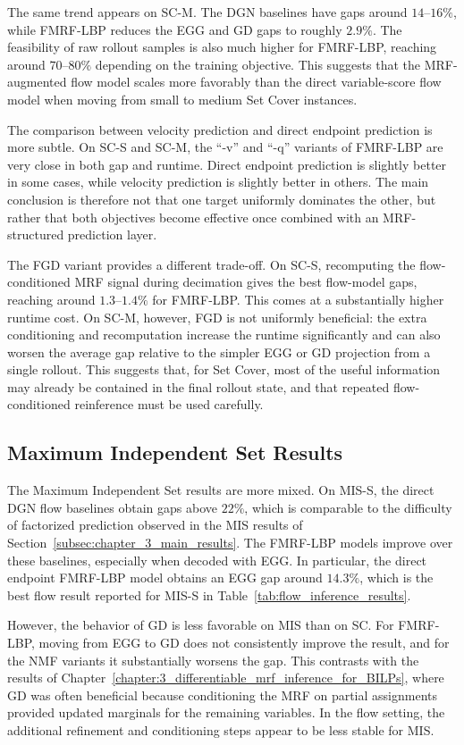 The same trend appears on SC-M. The DGN baselines have gaps around $14$--$16\%$, while FMRF-LBP reduces the EGG and GD gaps to roughly $2.9\%$. The feasibility of raw rollout samples is also much higher for FMRF-LBP, reaching around $70$--$80\%$ depending on the training objective. This suggests that the MRF-augmented flow model scales more favorably than the direct variable-score flow model when moving from small to medium Set Cover instances.

The comparison between velocity prediction and direct endpoint prediction is more subtle. On SC-S and SC-M, the ``-v'' and ``-q'' variants of FMRF-LBP are very close in both gap and runtime. Direct endpoint prediction is slightly better in some cases, while velocity prediction is slightly better in others. The main conclusion is therefore not that one target uniformly dominates the other, but rather that both objectives become effective once combined with an MRF-structured prediction layer.

The FGD variant provides a different trade-off. On SC-S, recomputing the flow-conditioned MRF signal during decimation gives the best flow-model gaps, reaching around $1.3$--$1.4\%$ for FMRF-LBP. This comes at a substantially higher runtime cost. On SC-M, however, FGD is not uniformly beneficial: the extra conditioning and recomputation increase the runtime significantly and can also worsen the average gap relative to the simpler EGG or GD projection from a single rollout. This suggests that, for Set Cover, most of the useful information may already be contained in the final rollout state, and that repeated flow-conditioned reinference must be used carefully.

\subsection{Maximum Independent Set Results}

The Maximum Independent Set results are more mixed. On MIS-S, the direct DGN flow baselines obtain gaps above $22\%$, which is comparable to the difficulty of factorized prediction observed in the MIS results of Section~\ref{subsec:chapter_3_main_results}. The FMRF-LBP models improve over these baselines, especially when decoded with EGG. In particular, the direct endpoint FMRF-LBP model obtains an EGG gap around $14.3\%$, which is the best flow result reported for MIS-S in Table~\ref{tab:flow_inference_results}.

However, the behavior of GD is less favorable on MIS than on SC. For FMRF-LBP, moving from EGG to GD does not consistently improve the result, and for the NMF variants it substantially worsens the gap. This contrasts with the results of Chapter~\ref{chapter:3_differentiable_mrf_inference_for_BILPs}, where GD was often beneficial because conditioning the MRF on partial assignments provided updated marginals for the remaining variables. In the flow setting, the additional refinement and conditioning steps appear to be less stable for MIS.


